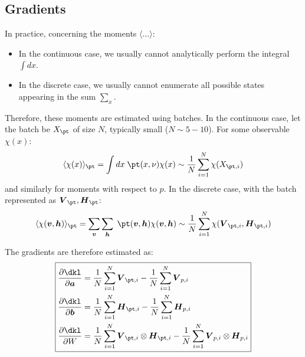 \documentclass[11pt]{article}
\newcommand{\vbf}{\boldsymbol{v}}
\newcommand{\hbf}{\boldsymbol{h}}
\newcommand{\abf}{\boldsymbol{a}}
\newcommand{\bbf}{\boldsymbol{b}}
\newcommand{\Vbf}{\boldsymbol{V}}
\newcommand{\Hbf}{\boldsymbol{H}}
\begin{document}

\subsection{Gradients}



In practice, concerning the moments $\langle \dots \rangle$:
\begin{itemize}
\item In the continuous case, we usually cannot analytically perform the integral $\int dx$.
\item In the discrete case, we usually cannot enumerate all possible states appearing in the sum $\sum_x$.
\end{itemize}
Therefore, these moments are estimated using batches. In the continuous case, let the batch be $X_{\pt}$ of size $N$, typically small ($N\sim 5 -10$). For some observable $\chi(x)$:
\begin{equation}
\langle \chi(x) \rangle_{\pt} = \int dx \; \pt(x, \nu) \chi(x) \sim \frac{1}{N} \sum_{i=1}^N \chi(X_{\pt,i})
\end{equation}
and similarly for moments with respect to $p$. In the discrete case, with the batch represented as $\Vbf_{\pt}, \Hbf_{\pt}$:
\begin{equation}
\langle \chi(\vbf, \hbf) \rangle_{\pt} = \sum_{\vbf} \sum_{\hbf} \; \pt(\vbf, \hbf) \chi(\vbf, \hbf) \sim \frac{1}{N} \sum_{i=1}^N \chi(\Vbf_{\pt,i}, \Hbf_{\pt,i} )
\end{equation}

The gradients are therefore estimated as:
\begin{equation}
\boxed{
\begin{split}
\frac{\partial \dkl}{\partial \abf} 
&=
\frac{1}{N} \sum_{i=1}^N \Vbf_{\pt, i}
- \frac{1}{N} \sum_{i=1}^N \Vbf_{p, i} \\
\frac{\partial \dkl}{\partial \bbf} 
&=
\frac{1}{N} \sum_{i=1}^N \Hbf_{\pt, i}
- \frac{1}{N} \sum_{i=1}^N \Hbf_{p, i} \\
\frac{\partial \dkl}{\partial W} 
&=
\frac{1}{N} \sum_{i=1}^N \Vbf_{\pt, i} \otimes \Hbf_{\pt, i}
- \frac{1}{N} \sum_{i=1}^N \Vbf_{p, i} \otimes \Hbf_{p, i}
\end{split}
}
\label{eq:grads}
\end{equation}

\end{document}
